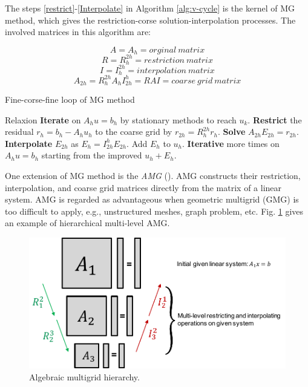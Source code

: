 The steps \ref{restrict}-\ref{Interpolate} in Algorithm \ref{alg:v-cycle} is the kernel of MG method, which gives the restriction-corse solution-interpolation processes. The involved matrices in this algorithm are:

\[A=A_h=orginal \ matrix\]
\[R=R_h^{2h}=restriction \ matrix\]
\[I=I_h^{2h}=interpolation \ matrix\]
\[A_{2h}=R_h^{2h}A_hI_{2h}^h=RAI=coarse \ grid \ matrix\]

\begin{algorithm}[htbp]{}
	\caption{Fine-corse-fine loop of MG method}   
	\label{alg:v-cycle}   
	\begin{algorithmic}[1]
		
		\State Relaxion \textbf{Iterate} on $A_hu=b_h$ by stationary methods to reach $u_k$.
		\State \textbf{Restrict} the residual $r_h = b_h - A_hu_h$ to the coarse grid by $r_{2h}=R_h^{2h}r_h$. \label{restrict}
		\State \textbf{Solve} $A_{2h}E_{2h}=r_{2h}$.
		\State \textbf{Interpolate} $E_{2h}$ as $E_h=I^{h}_{2h}E_{2h}$. Add $E_h$ to $u_h$.  \label{Interpolate}
		\State \textbf{Iterative} more times on $A_hu=b_h$ starting from the improved $u_h+E_h$.
		
	\end{algorithmic}  
\end{algorithm}


One extension of MG method is the \textit{AMG} (\cite{ruge1987algebraic, vanvek1996algebraic, brandt1986algebraic,brezina2001algebraic}). AMG constructs their restriction, interpolation, and coarse grid matrices directly from the matrix of a linear system. AMG is regarded as advantageous when geometric multigrid (GMG) is too difficult to apply, e.g., unstructured meshes, graph problem, etc.  Fig. \ref{multilevel-amg} gives an example of hierarchical multi-level AMG.

\begin{figure}[htbp]
	\centering
	\includegraphics[width=0.9\linewidth]{fig/multilevel-amg.pdf}
	\caption{Algebraic multigrid hierarchy.}
	\label{multilevel-amg}
\end{figure}

